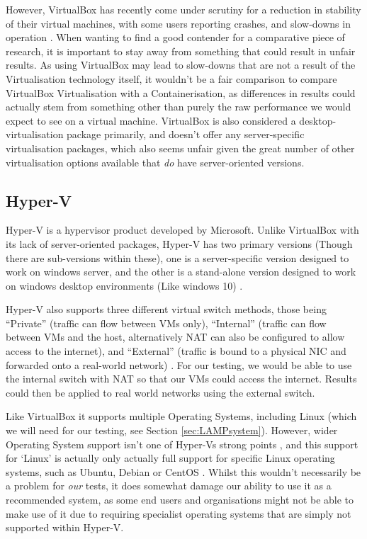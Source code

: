 However, VirtualBox has recently come under scrutiny for a reduction in stability of their virtual machines, with some users reporting crashes, and slow-downs in operation \citep{bradford_2020}. When wanting to find a good contender for a comparative piece of research, it is important to stay away from something that could result in unfair results. As using VirtualBox may lead to slow-downs that are not a result of the Virtualisation technology itself, it wouldn't be a fair comparison to compare VirtualBox Virtualisation with a Containerisation, as differences in results could actually stem from something other than purely the raw performance we would expect to see on a virtual machine. VirtualBox is also considered a desktop-virtualisation package primarily, and doesn't offer any server-specific virtualisation packages, which also seems unfair given the great number of other virtualisation options available that \emph{do} have server-oriented versions.

\subsection{Hyper-V}
Hyper-V is a hypervisor product developed by Microsoft. Unlike VirtualBox with its lack of server-oriented packages, Hyper-V has two primary versions (Though there are sub-versions within these), one is a server-specific version designed to work on windows server, and the other is a stand-alone version designed to work on windows desktop environments (Like windows 10) \citep{HyperVIntro}.

Hyper-V also supports three different virtual switch methods, those being ``Private'' (traffic can flow between VMs only), ``Internal'' (traffic can flow between VMs and the host, alternatively NAT can also be configured to allow access to the internet), and ``External'' (traffic is bound to a physical NIC and forwarded onto a real-world network) \citep{HyperVSwitches}. For our testing, we would be able to use the internal switch with NAT so that our VMs could access the internet. Results could then be applied to real world networks using the external switch.

Like VirtualBox it supports multiple Operating Systems, including Linux (which we will need for our testing, see Section \ref{sec:LAMPsystem}). However, wider Operating System support isn't one of Hyper-Vs strong points \citep{HyperVVMwareComparison}, and this support for `Linux' is actually only actually full support for specific Linux operating systems, such as Ubuntu, Debian or CentOS \citep{LinuxHyperVSupport}. Whilst this wouldn't necessarily be a problem for \emph{our} tests, it does somewhat damage our ability to use it as a recommended system, as some end users and organisations might not be able to make use of it due to requiring specialist operating systems that are simply not supported within Hyper-V.

